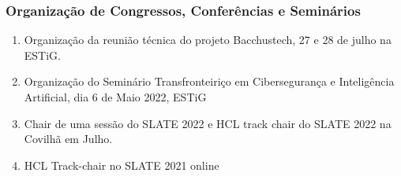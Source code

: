 \documentclass[11pt]{article}
\begin{document}
\subsubsection{Organização de Congressos, Conferências e Seminários}
\begin{enumerate}

\item {Organização da reunião técnica do projeto Bacchustech, 27 e 28 de julho na ESTiG.}
\item {Organização do Seminário Transfronteiriço em Cibersegurança e Inteligência Artificial, dia 6 de Maio 2022, ESTiG}
\item {Chair de uma sessão do SLATE 2022 e HCL track chair do SLATE 2022 na Covilhã em Julho.}
\item {HCL Track-chair no SLATE 2021 online }


\end{enumerate}
\end{document}
